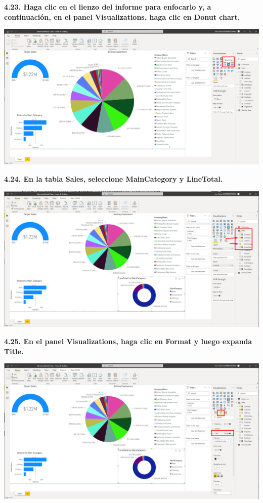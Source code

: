 \documentclass{article}
\begin{document}
\newpage
\textbf{4.23. Haga clic en el lienzo del informe para enfocarlo y, a continuación, en el panel \textbf{Visualizations}, haga clic en \textbf{Donut chart}.}

    \begin{center}
		\includegraphics[width=14cm]{./images/99} 
	\end{center}


\textbf{4.24. En la tabla \textbf{Sales}, seleccione \textbf{MainCategory} y \textbf{LineTotal}.}

    \begin{center}
		\includegraphics[width=14cm]{./images/100} 
	\end{center}

\newpage
\textbf{4.25. En el panel \textbf{Visualizations}, haga clic en \textbf{Format} y luego expanda \textbf{Title}.}

    \begin{center}
		\includegraphics[width=14cm]{./images/101} 
	\end{center}
\end{document}
